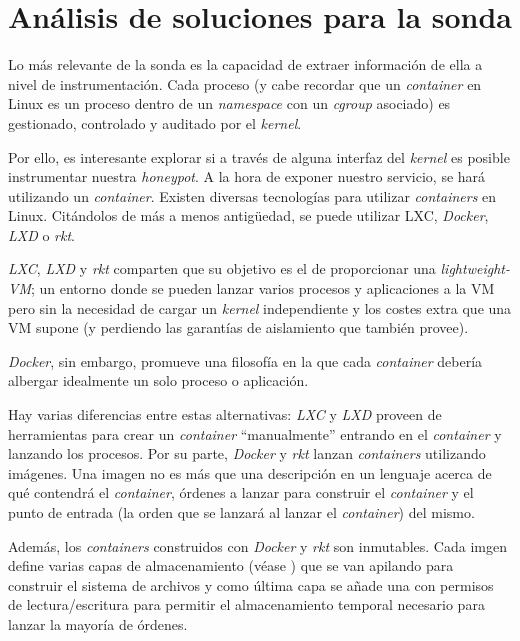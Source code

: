 \section{Análisis de soluciones para la sonda}
\label{sec:analisis-sonda}


Lo más relevante de la sonda es la capacidad de extraer información de ella a nivel de instrumentación. Cada proceso (y cabe recordar que un \emph{container} en Linux es un proceso dentro de un \emph{namespace} con un \emph{cgroup} asociado) es gestionado, controlado
y auditado por el \emph{kernel}.

Por ello, es interesante explorar si a través de alguna interfaz del \emph{kernel} es posible instrumentar nuestra \emph{honeypot}. A la hora de exponer nuestro servicio, se hará utilizando
un \emph{container}. Existen diversas tecnologías para utilizar \emph{containers} en Linux. Citándolos de más a menos antigüedad, se puede utilizar LXC, \emph{Docker}, \emph{LXD} o \emph{rkt}.

\emph{LXC}, \emph{LXD} y \emph{rkt} comparten que su objetivo es el de proporcionar una \emph{lightweight-VM}; un entorno donde se pueden lanzar varios procesos y aplicaciones a la VM
pero sin la necesidad de cargar un \emph{kernel} independiente y los costes extra que una VM supone (y perdiendo las garantías de aislamiento que también provee).

\emph{Docker}, sin embargo, promueve una filosofía en la que cada \emph{container} debería albergar idealmente un solo proceso o aplicación.

Hay varias diferencias entre estas alternativas: \emph{LXC} y \emph{LXD} proveen de herramientas para crear un \emph{container} ``manualmente'' entrando en el \emph{container} y lanzando los procesos. Por su parte, \emph{Docker} y \emph{rkt}
lanzan \emph{containers} utilizando imágenes. Una imagen no es más que una descripción en un lenguaje acerca de qué contendrá el \emph{container}, órdenes a lanzar para construir el \emph{container} y el punto de entrada (la orden que se lanzará al lanzar el \emph{container}) del mismo.

Además, los \emph{containers} construidos con \emph{Docker} y \emph{rkt} son inmutables. Cada imgen define varias capas de almacenamiento (véase \cite{docker-storage}) que se van apilando
para construir el sistema de archivos y como última capa se añade una con permisos de lectura/escritura para permitir el almacenamiento temporal necesario para lanzar
la mayoría de órdenes.

